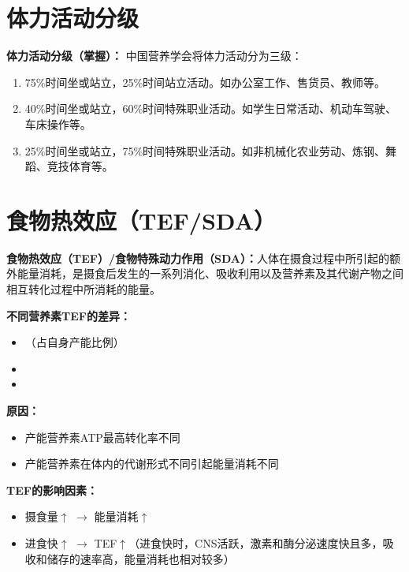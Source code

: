 \section{体力活动分级}

\begin{keybox}
\textbf{体力活动分级（掌握）：}
中国营养学会将体力活动分为三级：
\begin{enumerate}[leftmargin=*]
    \item {}75\%时间坐或站立，25\%时间站立活动。如办公室工作、售货员、教师等。
    \item {}40\%时间坐或站立，60\%时间特殊职业活动。如学生日常活动、机动车驾驶、车床操作等。
    \item {}25\%时间坐或站立，75\%时间特殊职业活动。如非机械化农业劳动、炼钢、舞蹈、竞技体育等。
\end{enumerate}
\end{keybox}

\section{食物热效应（TEF/SDA）}

\begin{keybox}
\textbf{食物热效应（TEF）/食物特殊动力作用（SDA）\difficulty：}人体在摄食过程中所引起的额外能量消耗，是摄食后发生的一系列消化、吸收利用以及营养素及其代谢产物之间相互转化过程中所消耗的能量。

\textbf{不同营养素TEF的差异：}
\begin{itemize}[leftmargin=*]
    \item {}（占自身产能比例）
    \item {}
    \item {}
\end{itemize}

\textbf{原因：}
\begin{itemize}[leftmargin=*]
    \item 产能营养素ATP最高转化率不同
    \item 产能营养素在体内的代谢形式不同引起能量消耗不同
\end{itemize}

\textbf{TEF的影响因素：}
\begin{itemize}[leftmargin=*]
    \item 摄食量$\uparrow$ $\rightarrow$ 能量消耗$\uparrow$
    \item 进食快$\uparrow$ $\rightarrow$ TEF$\uparrow$（进食快时，CNS活跃，激素和酶分泌速度快且多，吸收和储存的速率高，能量消耗也相对较多）
\end{itemize}
\end{keybox}

